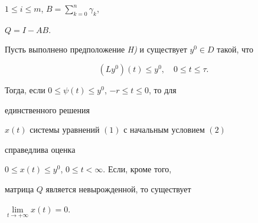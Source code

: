 $1 \le i \le m$, $B=\sum\limits_{k=0}^n\gamma_k$,


$Q=I-AB$.





\begin{thm}


Пусть выполнено предположение {\em H)} и существует $y^0\in D$ такой, что


\begin{equation}


(Ly^0)(t) \le y^0, \quad 0 \le t \le \tau.


\end{equation}


Тогда, если $0 \le \psi(t)\le y^0$, $-r\le t \le 0$, то для 


единственного решения


$x(t)$ системы уравнений $(1)$ с начальным условием $(2)$


справедлива оценка


$0 \le x(t) \le y^0$, $0 \le t < \infty$. Если, кроме того,


матрица $Q$ является невырожденной, то существует


$\lim\limits_{t\to +\infty} x(t)=0$.


\end{thm}





